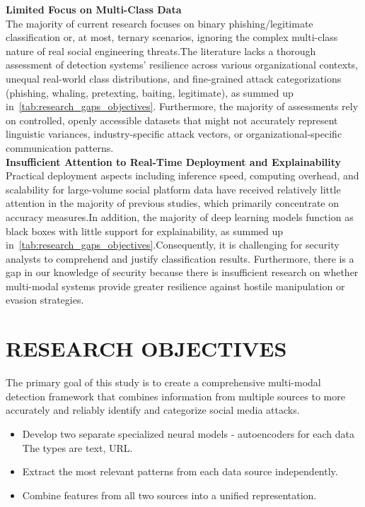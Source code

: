 \textbf{Limited Focus on Multi-Class Data}\\
The majority of current research focuses on binary phishing/legitimate classification or, at most, ternary scenarios, ignoring the complex multi-class nature of real social engineering threats.The literature lacks a thorough assessment of detection systems' resilience across various organizational contexts, unequal real-world class distributions, and fine-grained attack categorizations (phishing, whaling, pretexting, baiting, legitimate), as summed up in~\ref{tab:research_gaps_objectives}. Furthermore, the majority of assessments rely on controlled, openly accessible datasets that might not accurately represent linguistic variances, industry-specific attack vectors, or organizational-specific communication patterns.\\

\textbf{Insufficient Attention to Real-Time Deployment and Explainability}\\
Practical deployment aspects including inference speed, computing overhead, and scalability for large-volume social platform data have received relatively little attention in the majority of previous studies, which primarily concentrate on accuracy measures.In addition, the majority of deep learning models function as black boxes with little support for explainability, as summed up in~\ref{tab:research_gaps_objectives}.Consequently, it is challenging for security analysts to comprehend and justify classification results.
Furthermore, there is a gap in our knowledge of security because there is insufficient research on whether multi-modal systems provide greater resilience against hostile manipulation or evasion strategies.
\section{RESEARCH OBJECTIVES}
The primary goal of this study is to create a comprehensive multi-modal detection framework that combines information from multiple sources to more accurately and reliably identify and categorize social media attacks.
\begin{itemize}
    \item Develop two separate specialized neural models - autoencoders for each data
The types are text, URL.
    \item Extract the most relevant patterns from each data source independently.
    \item Combine features from all two sources into a unified representation.
\end{itemize}

